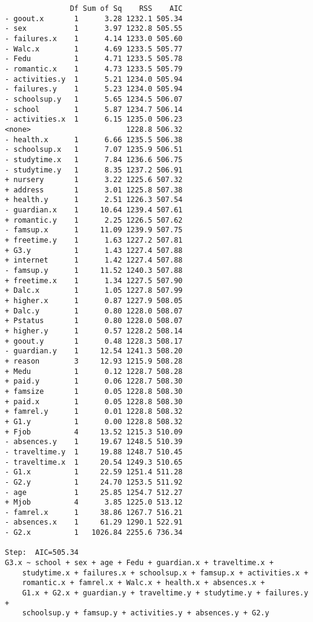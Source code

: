 \documentclass[11pt]{article}
\begin{document}
\begin{enumerate}
\begin{verbatim}
               Df Sum of Sq    RSS    AIC
- goout.x       1      3.28 1232.1 505.34
- sex           1      3.97 1232.8 505.55
- failures.x    1      4.14 1233.0 505.60
- Walc.x        1      4.69 1233.5 505.77
- Fedu          1      4.71 1233.5 505.78
- romantic.x    1      4.73 1233.5 505.79
- activities.y  1      5.21 1234.0 505.94
- failures.y    1      5.23 1234.0 505.94
- schoolsup.y   1      5.65 1234.5 506.07
- school        1      5.87 1234.7 506.14
- activities.x  1      6.15 1235.0 506.23
<none>                      1228.8 506.32
- health.x      1      6.66 1235.5 506.38
- schoolsup.x   1      7.07 1235.9 506.51
- studytime.x   1      7.84 1236.6 506.75
- studytime.y   1      8.35 1237.2 506.91
+ nursery       1      3.22 1225.6 507.32
+ address       1      3.01 1225.8 507.38
+ health.y      1      2.51 1226.3 507.54
- guardian.x    1     10.64 1239.4 507.61
+ romantic.y    1      2.25 1226.5 507.62
- famsup.x      1     11.09 1239.9 507.75
+ freetime.y    1      1.63 1227.2 507.81
+ G3.y          1      1.43 1227.4 507.88
+ internet      1      1.42 1227.4 507.88
- famsup.y      1     11.52 1240.3 507.88
+ freetime.x    1      1.34 1227.5 507.90
+ Dalc.x        1      1.05 1227.8 507.99
+ higher.x      1      0.87 1227.9 508.05
+ Dalc.y        1      0.80 1228.0 508.07
+ Pstatus       1      0.80 1228.0 508.07
+ higher.y      1      0.57 1228.2 508.14
+ goout.y       1      0.48 1228.3 508.17
- guardian.y    1     12.54 1241.3 508.20
+ reason        3     12.93 1215.9 508.28
+ Medu          1      0.12 1228.7 508.28
+ paid.y        1      0.06 1228.7 508.30
+ famsize       1      0.05 1228.8 508.30
+ paid.x        1      0.05 1228.8 508.30
+ famrel.y      1      0.01 1228.8 508.32
+ G1.y          1      0.00 1228.8 508.32
+ Fjob          4     13.52 1215.3 510.09
- absences.y    1     19.67 1248.5 510.39
- traveltime.y  1     19.88 1248.7 510.45
- traveltime.x  1     20.54 1249.3 510.65
- G1.x          1     22.59 1251.4 511.28
- G2.y          1     24.70 1253.5 511.92
- age           1     25.85 1254.7 512.27
+ Mjob          4      3.85 1225.0 513.12
- famrel.x      1     38.86 1267.7 516.21
- absences.x    1     61.29 1290.1 522.91
- G2.x          1   1026.84 2255.6 736.34

Step:  AIC=505.34
G3.x ~ school + sex + age + Fedu + guardian.x + traveltime.x + 
    studytime.x + failures.x + schoolsup.x + famsup.x + activities.x + 
    romantic.x + famrel.x + Walc.x + health.x + absences.x + 
    G1.x + G2.x + guardian.y + traveltime.y + studytime.y + failures.y + 
    schoolsup.y + famsup.y + activities.y + absences.y + G2.y


\end{verbatim}
\end{enumerate}
\end{document}
